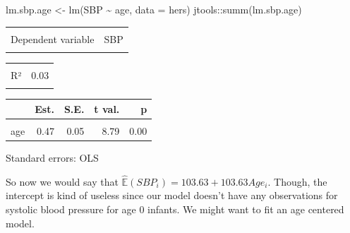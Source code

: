 \documentclass[
  letterpaper,
  DIV=11,
  numbers=noendperiod]{scrreport}
\newenvironment{Shaded}{\begin{snugshade}}{\end{snugshade}}
\newcommand{\AttributeTok}[1]{\textcolor[rgb]{0.40,0.45,0.13}{#1}}
\newcommand{\FunctionTok}[1]{\textcolor[rgb]{0.28,0.35,0.67}{#1}}
\newcommand{\NormalTok}[1]{\textcolor[rgb]{0.00,0.23,0.31}{#1}}
\newcommand{\OtherTok}[1]{\textcolor[rgb]{0.00,0.23,0.31}{#1}}
\newcommand{\SpecialCharTok}[1]{\textcolor[rgb]{0.37,0.37,0.37}{#1}}
\begin{document}
\begin{Shaded}
\begin{Highlighting}[]
\NormalTok{lm.sbp.age }\OtherTok{\textless{}{-}} \FunctionTok{lm}\NormalTok{(SBP }\SpecialCharTok{\textasciitilde{}}\NormalTok{ age, }\AttributeTok{data =}\NormalTok{ hers)}
\NormalTok{jtools}\SpecialCharTok{::}\FunctionTok{summ}\NormalTok{(lm.sbp.age)}
\end{Highlighting}
\end{Shaded}

\begin{table}[!h]
\centering
\begin{tabular}{lr}
\toprule
\cellcolor{gray!6}{Observations} & \cellcolor{gray!6}{2763}\\
Dependent variable & SBP\\
\cellcolor{gray!6}{Type} & \cellcolor{gray!6}{OLS linear regression}\\
\bottomrule
\end{tabular}
\end{table} \begin{table}[!h]
\centering
\begin{tabular}{lr}
\toprule
\cellcolor{gray!6}{F(1,2761)} & \cellcolor{gray!6}{77.21}\\
R² & 0.03\\
\cellcolor{gray!6}{Adj. R²} & \cellcolor{gray!6}{0.03}\\
\bottomrule
\end{tabular}
\end{table} \begin{table}[!h]
\centering
\begin{threeparttable}
\begin{tabular}{lrrrr}
\toprule
  & Est. & S.E. & t val. & p\\
\midrule
\cellcolor{gray!6}{(Intercept)} & \cellcolor{gray!6}{103.63} & \cellcolor{gray!6}{3.60} & \cellcolor{gray!6}{28.82} & \cellcolor{gray!6}{0.00}\\
age & 0.47 & 0.05 & 8.79 & 0.00\\
\bottomrule
\end{tabular}
\begin{tablenotes}
\item Standard errors: OLS
\end{tablenotes}
\end{threeparttable}
\end{table}

So now we would say that
\(\hat{\mathbb E}(SBP_i) = 103.63 + 103.63 Age_i\). Though, the
intercept is kind of useless since our model doesn't have any
observations for systolic blood pressure for age 0 infants. We might
want to fit an age centered model.
\end{document}
